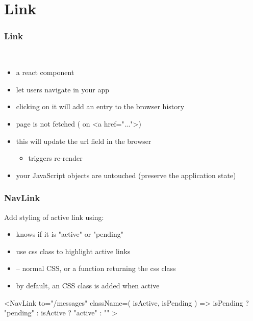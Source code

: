 \section{Link}
\begin{frame}[fragile] \frametitle{Link}
\\ 
\begin{itemize}
    \item a react component
    \item let users navigate in your app
    \item clicking on it will add an entry to the browser history
    \item page is not fetched ( on \code<a href="...">)
    \item this will update the url field in the browser
    \begin{itemize}
      \item {} triggers re-render
    \end{itemize}
    \item your JavaScript objects are untouched (preserve the application state)
\end{itemize}
\end{frame}

\begin{frame}[fragile] \frametitle{NavLink}
Add styling of active link using:
\begin{itemize}
  \item knows if it is "active" or "pending"
  \item use css class to highlight active links
  \item {} -- normal CSS, or a function returning the css class
  \item by default, an  CSS class is added when active
\end{itemize}

\begin{CodeBox}{}
<NavLink
  to="/messages"
  className={({ isActive, isPending }) =>
    isPending ? "pending" : isActive ? "active" : ""
  }
>\end{CodeBox}
\end{frame}

